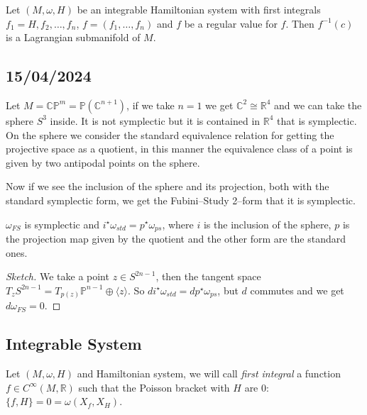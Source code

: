 \documentclass[misc]{subfiles}
\begin{document}
\begin{Nt}
    Let $(M,\omega,H)$ be an integrable Hamiltonian system with first integrals $f_1=H,f_2,\dots,f_n$, $f=(f_1,\dots,f_n)$ and $f$ be a regular value for $f$. Then $f^{-1}(c)$ is a Lagrangian submanifold of $M$.
\end{Nt}


\subsection*{15/04/2024}

\begin{Exp}
    Let $M=\mathbb{C}\mathbb{P}^m=\mathbb{P}(\mathbb{C}^{n+1})$, if we take $n=1$ we get $\mathbb{C}^2 \cong \mathbb{R}^4$ and we can take the sphere $S^3$ inside. It is not symplectic but it is contained in $\mathbb{R}^4$ that is symplectic. On the sphere we consider the standard equivalence relation for getting the projective space as a quotient, in this manner the equivalence class of a point is given by two antipodal points on the sphere.

    Now if we see the inclusion of the sphere and its projection, both with the standard symplectic form, we get the Fubini--Study 2--form that it is symplectic.
\end{Exp}

\begin{Thm}

    $\omega_{FS}$ is symplectic and $i^\star\omega_{std}=p^\star\omega_{ps}$, where $i$ is the inclusion of the sphere, $p$ is the projection map given by the quotient and the other form are the standard ones.

\begin{proof}[Sketch]
    We take a point $z \in S^{2n-1}$, then the tangent space $T_zS^{2n-1}=T_{p(z)}\mathbb{P}^{n-1} \oplus \langle z \rangle$. So $di^\star\omega_{std}=dp^\star\omega_{ps}$, but $d$ commutes and we get $d\omega_{FS}=0$.
\end{proof}

\end{Thm}

\subsection*{Integrable System}

\begin{Dfn}
    Let $(M,\omega,H)$ and Hamiltonian system, we will call \textit{first integral} a function $f \in C^\infty(M,\mathbb{R})$ such that the Poisson bracket with $H$ are 0: $\{f,H\}=0=\omega(X_f,X_H)$.
\end{Dfn}
\end{document}
